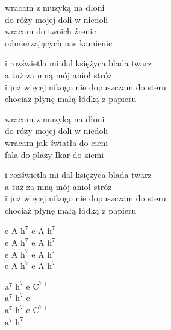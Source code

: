 \begin{textn}
    wracam z muzyką na dłoni\\
    do róży mojej doli w niedoli\\
    wracam do twoich źrenic\\
    odmierzających nas kamienic

    i rozświetla mi dal księżyca blada twarz\\
    a tuż za mną mój anioł stróż\\
    i już więcej nikogo nie dopuszczam do steru\\
    chociaż płynę małą łódką z papieru

    wracam z muzyką na dłoni\\
    do róży mojej doli w niedoli\\
    wracam jak światła do cieni\\
    fala do plaży Ikar do ziemi

    i rozświetla mi dal księżyca blada twarz\\
    a tuż za mną mój anioł stróż\\
    i już więcej nikogo nie dopuszczam do steru\\
    chociaż płynę małą łódką z papieru
\end{textn}
\begin{chordw}
    e A $\mathrm{h^{7}}$ e A $\mathrm{h^{7}}$\\
    e A $\mathrm{h^{7}}$ e A $\mathrm{h^{7}}$\\
    e A $\mathrm{h^{7}}$ e A $\mathrm{h^{7}}$\\
    e A $\mathrm{h^{7}}$ e A $\mathrm{h^{7}}$

    $\mathrm{a^{7}}$ $\mathrm{h^{7}}$ e $\mathrm{C^{7+}}$\\
    $\mathrm{a^{7}}$ $\mathrm{h^{7}}$ e\\
    $\mathrm{a^{7}}$ $\mathrm{h^{7}}$ e $\mathrm{C^{7+}}$\\
    $\mathrm{a^{7}}$ $\mathrm{h^{7}}$
\end{chordw}
